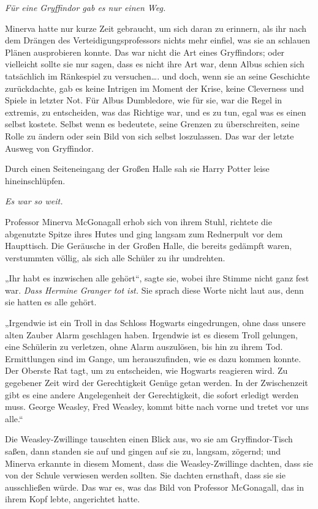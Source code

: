 {\emph{Für eine Gryffindor gab es nur einen Weg.}

Minerva hatte nur kurze Zeit gebraucht, um sich daran zu erinnern, als ihr nach dem Drängen des Verteidigungsprofessors nichts mehr einfiel, was sie an schlauen Plänen ausprobieren konnte. Das war nicht die Art eines Gryffindors; oder vielleicht sollte sie nur sagen, dass es nicht ihre Art war, denn Albus schien sich tatsächlich im Ränkespiel zu versuchen…. und doch, wenn sie an seine Geschichte zurückdachte, gab es keine Intrigen im Moment der Krise, keine Cleverness und Spiele in letzter Not. Für Albus Dumbledore, wie für sie, war die Regel in extremis, zu entscheiden, was das Richtige war, und es zu tun, egal was es einen selbst kostete. Selbst wenn es bedeutete, seine Grenzen zu überschreiten, seine Rolle zu ändern oder sein Bild von sich selbst loszulassen. Das war der letzte Ausweg von Gryffindor.

Durch einen Seiteneingang der Großen Halle sah sie Harry Potter leise hineinschlüpfen.

\emph{Es war so weit.}

Professor Minerva McGonagall erhob sich von ihrem Stuhl, richtete die abgenutzte Spitze ihres Hutes und ging langsam zum Rednerpult vor dem Haupttisch. Die Geräusche in der Großen Halle, die bereits gedämpft waren, verstummten völlig, als sich alle Schüler zu ihr umdrehten.

„Ihr habt es inzwischen alle gehört“, sagte sie, wobei ihre Stimme nicht ganz fest war. \emph{Dass Hermine Granger tot ist.} Sie sprach diese Worte nicht laut aus, denn sie hatten es alle gehört.

„Irgendwie ist ein Troll in das Schloss Hogwarts eingedrungen, ohne dass unsere alten Zauber Alarm geschlagen haben. Irgendwie ist es diesem Troll gelungen, eine Schülerin zu verletzen, ohne Alarm auszulösen, bis hin zu ihrem Tod. Ermittlungen sind im Gange, um herauszufinden, wie es dazu kommen konnte. Der Oberste Rat tagt, um zu entscheiden, wie Hogwarts reagieren wird. Zu gegebener Zeit wird der Gerechtigkeit Genüge getan werden. In der Zwischenzeit gibt es eine andere Angelegenheit der Gerechtigkeit, die sofort erledigt werden muss. George Weasley, Fred Weasley, kommt bitte nach vorne und tretet vor uns alle.“

Die Weasley-Zwillinge tauschten einen Blick aus, wo sie am Gryffindor-Tisch saßen, dann standen sie auf und gingen auf sie zu, langsam, zögernd; und Minerva erkannte in diesem Moment, dass die Weasley-Zwillinge dachten, dass sie von der Schule verwiesen werden sollten. Sie dachten ernsthaft, dass sie sie ausschließen würde. Das war es, was das Bild von Professor McGonagall, das in ihrem Kopf lebte, angerichtet hatte.

}

